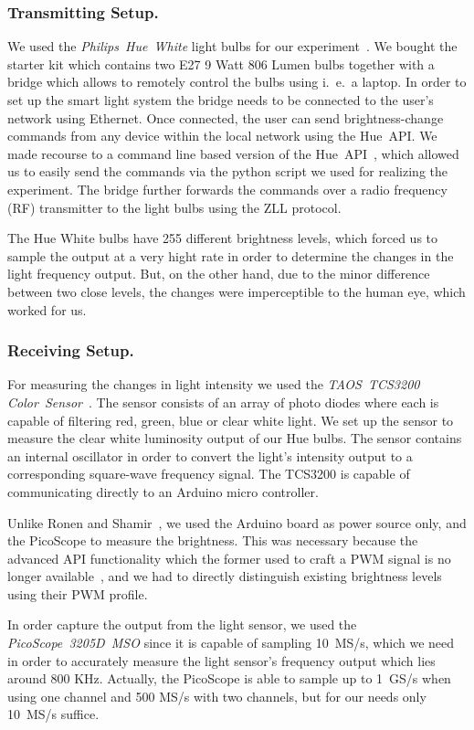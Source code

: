 \subsubsection{Transmitting Setup.} We used the \textit{Philips~Hue~White} light bulbs for our experiment~\cite{Philips:2018:Hue}. We bought the starter kit which contains two E27 9 Watt 806 Lumen bulbs together with a bridge which allows to remotely control the bulbs using i.~e.\ a laptop. In order to set up the smart light system the bridge needs to be connected to the user's network using Ethernet. Once connected, the user can send brightness-change commands from any device within the local network using the Hue~API. We made recourse to a command line based version of the Hue~API~\cite{Bahamas10:2018:HueApi}, which allowed us to easily send the commands via the python script we used for realizing the experiment. The bridge further forwards the commands over a radio frequency (RF) transmitter to the light bulbs using the ZLL protocol.

The Hue White bulbs have 255 different brightness levels, which forced us to sample the output at a very hight rate in order to determine the changes in the light frequency output. But, on the other hand, due to the minor difference between two close levels, the changes were imperceptible to the human eye, which worked for us.

\subsubsection{Receiving Setup.} For measuring the changes in light intensity we used the \textit{TAOS~TCS3200 Color~Sensor}~\cite{DFRobot:2018:Sensor}. The sensor consists of an array of photo diodes where each is capable of filtering red, green, blue or clear white light. We set up the sensor to measure the clear white luminosity output of our Hue bulbs. The sensor contains an internal oscillator in order to convert the light's intensity output to a corresponding square-wave frequency signal. The TCS3200 is capable of communicating directly to an Arduino micro controller.

Unlike Ronen and Shamir~\cite{Ronen:2016:EFAIDCSL}, we used the Arduino board as power source only, and the PicoScope to measure the brightness. This was necessary because the advanced API functionality which the former used to craft a PWM signal is no longer available~\cite{Ronen:2016:EFAIDCSL}, and we had to directly distinguish existing brightness levels using their PWM profile.

In order capture the output from the light sensor, we used the \textit{PicoScope~3205D~MSO} since it is capable of sampling 10~MS/s, which we need in order to accurately measure the light sensor's frequency output which lies around 800 KHz. Actually, the PicoScope is able to sample up to 1~GS/s when using one channel and 500 MS/s with two channels, but for our needs only 10~MS/s suffice.

